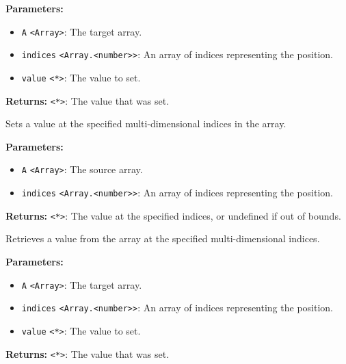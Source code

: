 \documentclass[12pt,a4paper]{article}
\begin{document}
\noindent \textbf{Parameters:}
\begin{itemize}
  \item \texttt{A} \texttt{<Array>}: The target array.
  \item \texttt{indices} \texttt{<Array.<number>>}: An array of indices representing the position.
  \item \texttt{value} \texttt{<*>}: The value to set.
\end{itemize}

\noindent \textbf{Returns:} \texttt{<*>}: The value that was set.

\noindent Sets a value at the specified multi-dimensional indices in the array.

\vspace{5mm}
\noindent {}


\noindent \textbf{Parameters:}
\begin{itemize}
  \item \texttt{A} \texttt{<Array>}: The source array.
  \item \texttt{indices} \texttt{<Array.<number>>}: An array of indices representing the position.
\end{itemize}

\noindent \textbf{Returns:} \texttt{<*>}: The value at the specified indices, or undefined if out of bounds.

\noindent Retrieves a value from the array at the specified multi-dimensional indices.

\vspace{5mm}
\noindent {}


\noindent \textbf{Parameters:}
\begin{itemize}
  \item \texttt{A} \texttt{<Array>}: The target array.
  \item \texttt{indices} \texttt{<Array.<number>>}: An array of indices representing the position.
  \item \texttt{value} \texttt{<*>}: The value to set.
\end{itemize}

\noindent \textbf{Returns:} \texttt{<*>}: The value that was set.
\end{document}
